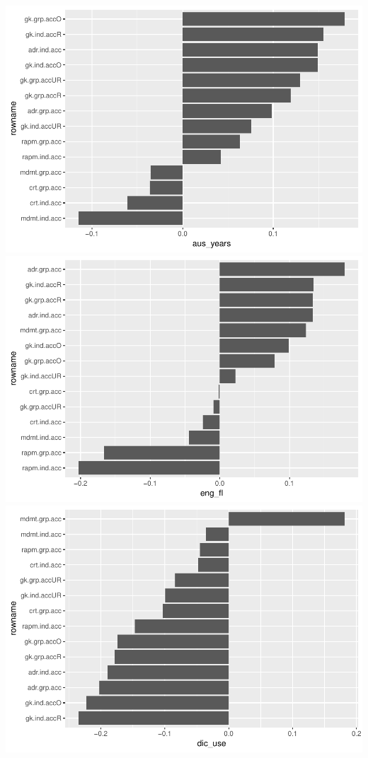 \documentclass[]{article}
\begin{document}
\includegraphics{corr_analyses_files/figure-latex/unnamed-chunk-1-4.pdf}
\includegraphics{corr_analyses_files/figure-latex/unnamed-chunk-1-5.pdf}
\includegraphics{corr_analyses_files/figure-latex/unnamed-chunk-1-6.pdf}
\end{document}
